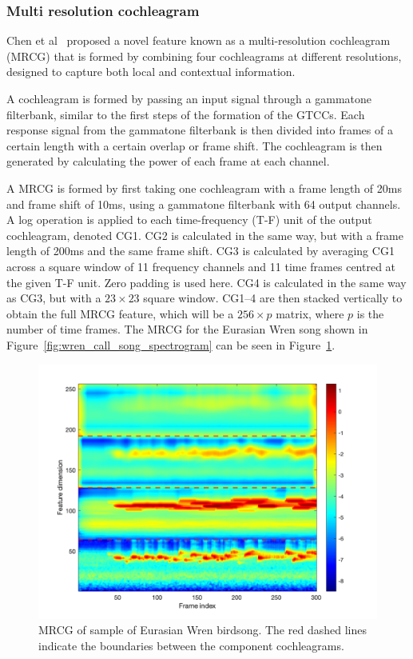 \subsubsection{Multi resolution cochleagram}

Chen et al~\cite{chen2014feature} proposed a novel feature known as a
multi-resolution cochleagram (MRCG) that is formed by combining four
cochleagrams at different resolutions, designed to capture both local and
contextual information.

A cochleagram is formed by passing an input signal through a gammatone
filterbank, similar to the first steps of the formation of the GTCCs\@. Each
response signal from the gammatone filterbank is then divided into frames of a
certain length with a certain overlap or frame shift. The cochleagram is then
generated by calculating the power of each frame at each channel.

A MRCG is formed by first taking one cochleagram with a frame length of 20ms and
frame shift of 10ms, using a gammatone filterbank with 64 output channels. A log
operation is applied to each time-frequency (T-F) unit of the output
cochleagram, denoted CG1. CG2 is calculated in the same way, but with a frame
length of 200ms and the same frame shift. CG3 is calculated by averaging CG1
across a square window of 11 frequency channels and 11 time frames centred at
the given T-F unit. Zero padding is used here. CG4 is calculated in the same way
as CG3, but with a $23 \times 23$ square window. CG1--4 are then stacked
vertically to obtain the full MRCG feature, which will be a $256 \times p$
matrix, where $p$ is the number of time frames. The MRCG for the Eurasian Wren
song shown in Figure~\ref{fig:wren_call_song_spectrogram} can be seen in
Figure~\ref{fig:mrcg_example}.

\begin{figure}[ht]
  \centering
  \includegraphics[width=\textwidth]{figures/mrcg_example.png}
  \caption{MRCG of sample of Eurasian Wren birdsong. The red dashed lines
  indicate the boundaries between the component
cochleagrams.}\label{fig:mrcg_example}
\end{figure}

